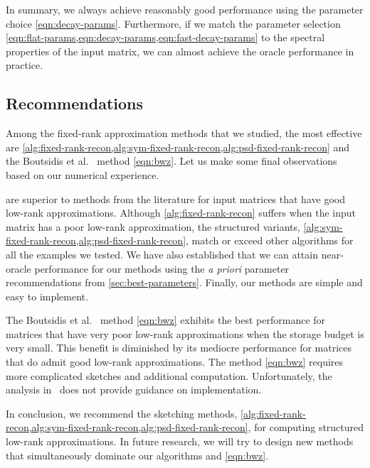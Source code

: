 \documentclass[final]{siamart1116}
\numberwithin{equation}{section}
\numberwithin{theorem}{section}
\numberwithin{figure}{section}
\begin{document}
\vspace{0.5pc}

In summary, we always achieve reasonably good performance using
the parameter choice \cref{eqn:decay-params}.  Furthermore,
if we match the parameter selection \cref{eqn:flat-params,eqn:decay-params,eqn:fast-decay-params}
to the spectral properties of the
input matrix, we can almost achieve the oracle performance in practice.

\subsection{Recommendations}
\label{sec:recommendations}

Among the fixed-rank approximation methods that we studied,
the most effective are \cref{alg:fixed-rank-recon,alg:sym-fixed-rank-recon,alg:psd-fixed-rank-recon}
and the Boutsidis et al.~\cite[Thm.~12]{BWZ16:Optimal-Principal-STOC} method \cref{eqn:bwz}.
Let us make some final observations based on our numerical experience.

are superior to methods from the literature for input matrices that have
good low-rank approximations.  Although \cref{alg:fixed-rank-recon} suffers
when the input matrix has a poor low-rank approximation, the structured
variants, \cref{alg:sym-fixed-rank-recon,alg:psd-fixed-rank-recon}, match or
exceed other algorithms for all the examples we tested.  We have also
established that we can attain near-oracle performance for our methods
using the \emph{a priori} parameter recommendations from
\cref{sec:best-parameters}. Finally, our methods are simple and easy to
implement.


The Boutsidis et al.~\cite[Thm.~12]{BWZ16:Optimal-Principal-STOC} method \cref{eqn:bwz} exhibits the best performance
for matrices that have very poor low-rank approximations when the storage
budget is very small.  This benefit is diminished by its mediocre performance
for matrices that do admit good low-rank approximations.
The method \cref{eqn:bwz} requires more complicated sketches and additional computation.
Unfortunately, the analysis in~\cite{BWZ16:Optimal-Principal-STOC}
does not provide guidance on implementation.




In conclusion, we recommend the sketching methods,
\cref{alg:fixed-rank-recon,alg:sym-fixed-rank-recon,alg:psd-fixed-rank-recon},
for computing structured low-rank approximations.
In future research, we will try to design new methods
that simultaneously dominate our algorithms and \cref{eqn:bwz}.
\end{document}
